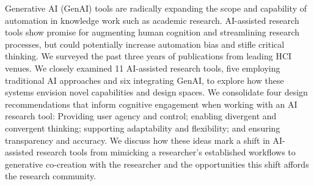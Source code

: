 Generative AI (GenAI) tools are radically expanding the scope and capability of automation in knowledge work such as academic research. AI-assisted research tools show promise for augmenting human cognition and streamlining research processes, but could potentially increase automation bias and stifle critical thinking. We surveyed the past three years of publications from leading HCI venues. We closely examined 11 AI-assisted research tools, five employing traditional AI approaches and six integrating GenAI, to explore how these systems envision novel capabilities and design spaces. We consolidate four design recommendations that inform cognitive engagement when working with an AI research tool: Providing user agency and control; enabling divergent and convergent thinking; supporting adaptability and flexibility; and ensuring transparency and accuracy. We discuss how these ideas mark a shift in AI-assisted research tools from mimicking a researcher's established workflows to generative co-creation with the researcher and the opportunities this shift affords the research community.